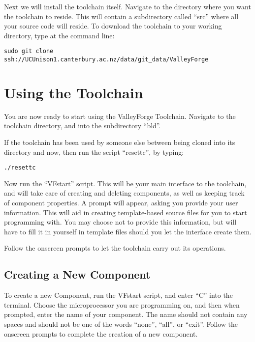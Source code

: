 \documentclass[a4paper, oneside, 11pt, titlepage, onecolumn, openright]{report}
\begin{document}
Next we will install the toolchain itself. Navigate to the directory where you want the toolchain to reside. This will contain a subdirectory called ``src'' where all your source code will reside.
To download the toolchain to your working directory, type at the command line: \newline

				\begin{lstlisting}
sudo git clone ssh://UCUnison1.canterbury.ac.nz/data/git_data/ValleyForge
				\end{lstlisting}

			\section{Using the Toolchain }
				\label{s:Getting Started:Using The Toolchain}
			
				You are now ready to start using the ValleyForge Toolchain. Navigate to the toolchain directory, and into the subdirectory ``bld''. 

If the toolchain has been used by someone else between being cloned into its directory and now, then run the script ``resettc'', by typing: \newline

				\begin{lstlisting}
./resettc
				\end{lstlisting}

 
Now run the ``VFstart'' script. This will be your main interface to the toolchain, and will take care of creating and deleting components, as well as keeping track of component properties. A prompt will appear, asking you provide your user information. This will aid in creating template-based source files for you to start programming with.  You may choose not to provide this information, but will have to fill it in yourself in template files should you let the interface create them.
 
Follow the onscreen prompts to let the toolchain carry out its operations.

				\subsection{Creating a New Component}
					\label{ss:Getting Started:Using The Toolchain:Create New Component}
			
				To create a new Component, run the VFstart script, and enter ``C'' into the terminal. Choose the microprocessor you are programming on, and then when prompted, enter the name of your component. The name should not contain any spaces and should not be one of the words ``none'', ``all'', or ``exit''. Follow the onscreen prompts to complete the creation of a new component. 
\end{document}
